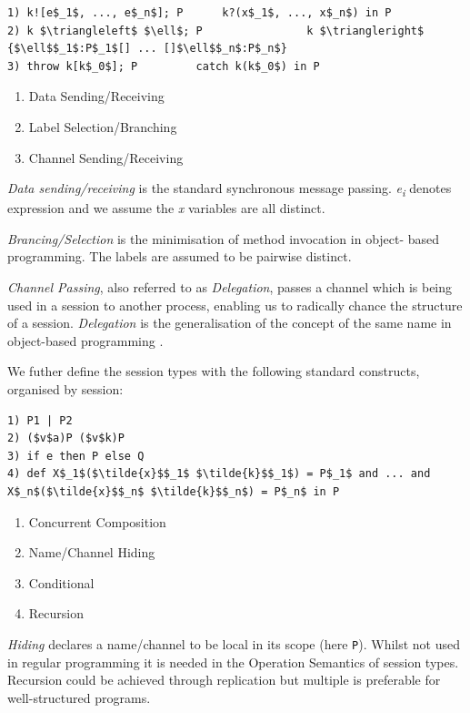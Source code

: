 \documentclass[11pt]{scrartcl}
\begin{document}
\begin{lstlisting}
1) k![e$_1$, ..., e$_n$]; P      k?(x$_1$, ..., x$_n$) in P
2) k $\triangleleft$ $\ell$; P                k $\triangleright$ {$\ell$$_1$:P$_1$[] ... []$\ell$$_n$:P$_n$}
3) throw k[k$_0$]; P         catch k(k$_0$) in P 
\end{lstlisting}	

\begin{enumerate}
  \item Data Sending/Receiving
  \item Label Selection/Branching
  \item Channel Sending/Receiving
\end{enumerate}

\emph{Data sending/receiving} is the standard synchronous message passing. 
\emph{e\textsubscript{i}} denotes expression and we assume the \emph{x} 
variables are all distinct.

\emph{Brancing/Selection} is the minimisation of method invocation in object-
based programming. The labels are assumed to be pairwise distinct. 

\emph{Channel Passing}, also referred to as \emph{Delegation}, passes a channel 
which is being used in a session to another process, enabling us to radically 
chance the structure of a session. \emph{Delegation} is the generalisation of 
the concept of the same name in object-based programming \cite{YT87}.

We futher define the session types with the following standard constructs, 
organised by session:

\begin{lstlisting}
1) P1 | P2
2) ($v$a)P ($v$k)P 
3) if e then P else Q 
4) def X$_1$($\tilde{x}$$_1$ $\tilde{k}$$_1$) = P$_1$ and ... and X$_n$($\tilde{x}$$_n$ $\tilde{k}$$_n$) = P$_n$ in P
\end{lstlisting}

\begin{enumerate}
  \item Concurrent Composition
  \item Name/Channel Hiding
  \item Conditional
  \item Recursion
\end{enumerate}

\emph{Hiding} declares a name/channel to be local in its scope (here 
\texttt{P}). Whilst not used in regular programming it is needed in the 
Operation Semantics of session types. Recursion could be achieved through 
replication but multiple is preferable for well-structured programs.
\end{document}
